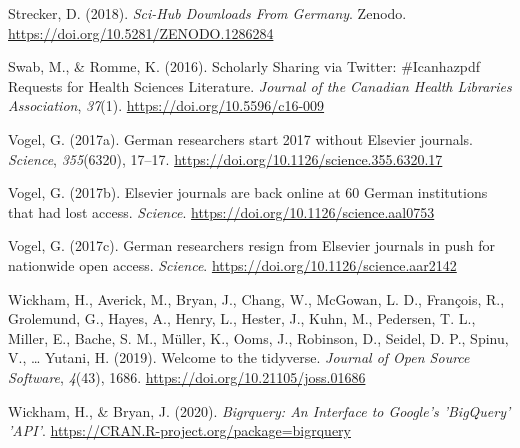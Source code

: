 \documentclass[
]{article}
\newlength{\cslhangindent}
\newlength{\cslentryspacingunit} %
\newenvironment{CSLReferences}[2] %
 {%
  \setlength{\parindent}{0pt}
  \ifodd #1
  \let\oldpar\par
  \def\par{\hangindent=\cslhangindent\oldpar}
  \fi
  \setlength{\parskip}{#2\cslentryspacingunit}
 }%
 {}
\begin{document}
\begin{CSLReferences}{1}{0}
\leavevmode{}%
Strecker, D. (2018). \emph{Sci-{Hub} {Downloads} {From} {Germany}}. Zenodo. \url{https://doi.org/10.5281/ZENODO.1286284}

\leavevmode{}%
Swab, M., \& Romme, K. (2016). Scholarly {Sharing} via {Twitter}: \#Icanhazpdf {Requests} for {Health} {Sciences} {Literature}. \emph{Journal of the Canadian Health Libraries Association}, \emph{37}(1). \url{https://doi.org/10.5596/c16-009}

\leavevmode{}%
Vogel, G. (2017a). German researchers start 2017 without {Elsevier} journals. \emph{Science}, \emph{355}(6320), 17--17. \url{https://doi.org/10.1126/science.355.6320.17}

\leavevmode{}%
Vogel, G. (2017b). Elsevier journals are back online at 60 {German} institutions that had lost access. \emph{Science}. \url{https://doi.org/10.1126/science.aal0753}

\leavevmode{}%
Vogel, G. (2017c). German researchers resign from {Elsevier} journals in push for nationwide open access. \emph{Science}. \url{https://doi.org/10.1126/science.aar2142}

\leavevmode{}%
Wickham, H., Averick, M., Bryan, J., Chang, W., McGowan, L. D., François, R., Grolemund, G., Hayes, A., Henry, L., Hester, J., Kuhn, M., Pedersen, T. L., Miller, E., Bache, S. M., Müller, K., Ooms, J., Robinson, D., Seidel, D. P., Spinu, V., \ldots{} Yutani, H. (2019). Welcome to the tidyverse. \emph{Journal of Open Source Software}, \emph{4}(43), 1686. \url{https://doi.org/10.21105/joss.01686}

\leavevmode{}%
Wickham, H., \& Bryan, J. (2020). \emph{Bigrquery: {An} {Interface} to {Google}'s '{BigQuery}' '{API}'}. \url{https://CRAN.R-project.org/package=bigrquery}

\end{CSLReferences}
\end{document}
